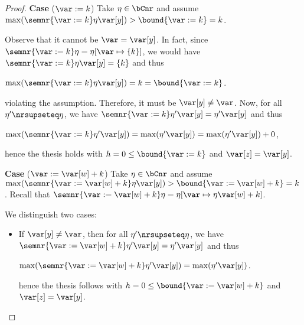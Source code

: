 \begin{proof}
  

  


  
  \medskip
  
  \noindent
  \textbf{Case} (\(\var := k\))
  Take \(\eta \in \bCnr\) and assume
  \(\max(\semnr{\var := k}\eta \var[y]) > \bound{\var := k} = k\).

  Observe that it cannot be \(\var = \var[y]\). In fact, since
  \(\semnr{\var := k}\eta = \eta[\var \mapsto \{k\}]\), we would have
  \(\semnr{\var := k}\eta \var[y] = \{k\}\) and thus
  \begin{center}
    \(\max(\semnr{\var := k}\eta \var[y]) = k  = \bound{\var := k}\).
  \end{center}
  violating the assumption.
  Therefore, it must be \(\var[y] \neq \var\). Now, for all
  \(\eta' \nrsupseteq \eta\), we have
  \(\semnr{\var := k}\eta' \var[y] = \eta' \var[y]\) and thus
  \begin{center}
    \(\max(\semnr{\var := k}\eta' \var[y]) = \max(\eta' \var[y]) =
    \max(\eta' \var[y]) + 0\),
  \end{center}
  hence the thesis holds with \(h =0 \leq \bound{\var :=k}\) and \(\var[z] = \var[y]\).
  

  
  \medskip
  
  \noindent
  \textbf{Case} (\(\var := \var[w] + k\))
  Take \(\eta \in \bCnr\) and assume
  \(\max(\semnr{\var := \var[w] + k}\eta \var[y]) > \bound{\var := \var[w] + k} = k\).
  Recall that
  \(\semnr{\var := \var[w] + k}\eta = \eta[\var \mapsto \eta \var[w] + k]\).
  
  We distinguish two cases:
  \begin{itemize}
    
  \item If \(\var[y] \neq \var\), then for all \(\eta' \nrsupseteq \eta\), we have
    \(\semnr{\var := \var[w] + k}\eta' \var[y] = \eta' \var[y]\) and thus
    \begin{center}
      \(\max(\semnr{\var := \var[w] + k}\eta' \var[y]) = \max(\eta' \var[y])\).
    \end{center}
    hence the thesis follows with
    \(h =0 \leq \bound{\var := \var[w] + k}\) and \(\var[z] = \var[y]\).
    

\end{itemize}
\end{proof}
